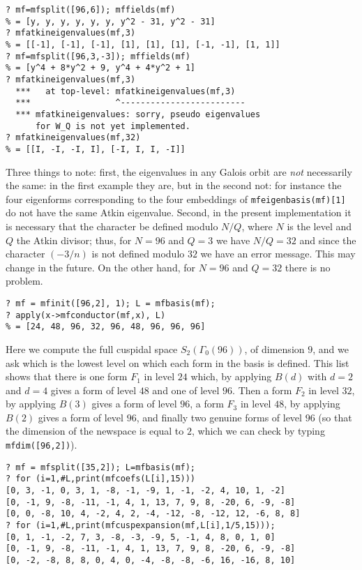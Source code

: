 \documentclass[11pt]{article}
\newcommand{\G}{\Gamma}
\def\kbd#1{{\tt #1}}
\begin{document}
\begin{verbatim}
? mf=mfsplit([96,6]); mffields(mf)
% = [y, y, y, y, y, y, y^2 - 31, y^2 - 31]
? mfatkineigenvalues(mf,3)
% = [[-1], [-1], [-1], [1], [1], [1], [-1, -1], [1, 1]]
? mf=mfsplit([96,3,-3]); mffields(mf)
% = [y^4 + 8*y^2 + 9, y^4 + 4*y^2 + 1]
? mfatkineigenvalues(mf,3)
  ***   at top-level: mfatkineigenvalues(mf,3)
  ***                 ^-------------------------
  *** mfatkineigenvalues: sorry, pseudo eigenvalues
      for W_Q is not yet implemented.
? mfatkineigenvalues(mf,32)
% = [[I, -I, -I, I], [-I, I, I, -I]]
\end{verbatim}

Three things to note: first, the eigenvalues in any Galois orbit are \emph{not}
necessarily the same: in the first example they are, but in the second not:
for instance the four eigenforms corresponding to the four embeddings of
\kbd{mfeigenbasis(mf)[1]} do not have the same Atkin eigenvalue. Second, in
the present implementation it is necessary that the character be defined
modulo $N/Q$, where $N$ is the level and $Q$ the Atkin divisor; thus, for
$N=96$ and $Q=3$ we have $N/Q=32$ and since the character $(-3/n)$ is not
defined modulo $32$ we have an error message. This may change in the future.
On the other hand, for $N=96$ and $Q=32$ there is no problem.

\medskip

\begin{verbatim}
? mf = mfinit([96,2], 1); L = mfbasis(mf);
? apply(x->mfconductor(mf,x), L)
% = [24, 48, 96, 32, 96, 48, 96, 96, 96]
\end{verbatim}

Here we compute the full cuspidal space $S_2(\G_0(96))$, of dimension $9$,
and we ask which is the lowest level on which each form in the basis
is defined. This list shows that there is one form $F_1$ in level $24$
which, by applying $B(d)$ with $d=2$ and $d=4$ gives a form of level $48$
and one of level $96$. Then a form $F_2$ in level $32$, by applying $B(3)$
gives a form of level $96$, a form $F_3$ in level $48$, by applying $B(2)$
gives a form of level $96$, and finally two genuine forms of level $96$
(so that the dimension of the newspace is equal to $2$, which we can check
by typing \kbd{mfdim([96,2])}).

\medskip

\begin{verbatim}
? mf = mfsplit([35,2]); L=mfbasis(mf);
? for (i=1,#L,print(mfcoefs(L[i],15)))
[0, 3, -1, 0, 3, 1, -8, -1, -9, 1, -1, -2, 4, 10, 1, -2]
[0, -1, 9, -8, -11, -1, 4, 1, 13, 7, 9, 8, -20, 6, -9, -8]
[0, 0, -8, 10, 4, -2, 4, 2, -4, -12, -8, -12, 12, -6, 8, 8]
? for (i=1,#L,print(mfcuspexpansion(mf,L[i],1/5,15)));
[0, 1, -1, -2, 7, 3, -8, -3, -9, 5, -1, 4, 8, 0, 1, 0]
[0, -1, 9, -8, -11, -1, 4, 1, 13, 7, 9, 8, -20, 6, -9, -8]
[0, -2, -8, 8, 8, 0, 4, 0, -4, -8, -8, -6, 16, -16, 8, 10]
\end{verbatim}
\end{document}
